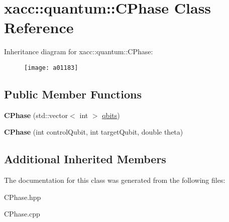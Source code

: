 \hypertarget{a01183}{}\section{xacc\+:\+:quantum\+:\+:C\+Phase Class Reference}
\label{a01183}
Inheritance diagram for xacc\+:\+:quantum\+:\+:C\+Phase\+:\begin{figure}[H]
\begin{center}
\leavevmode
\texttt{[image: a01183]}
\end{center}
\end{figure}
\subsection*{Public Member Functions}
\begin{DoxyCompactItemize}
\item 
\mbox{\label{a01183_a5899f838bc4b892d179f51fcf0ac4cc8}} 
{\bfseries C\+Phase} (std\+::vector$<$ int $>$ \hyperlink{a01159_a2a56be6c2519ea65df4d06f4abae1393}{qbits})
\item 
\mbox{\label{a01183_af642f499455f0065279a1e1d178c818f}} 
{\bfseries C\+Phase} (int control\+Qubit, int target\+Qubit, double theta)
\end{DoxyCompactItemize}
\subsection*{Additional Inherited Members}


The documentation for this class was generated from the following files\+:\begin{DoxyCompactItemize}
\item 
C\+Phase.\+hpp\item 
C\+Phase.\+cpp\end{DoxyCompactItemize}
